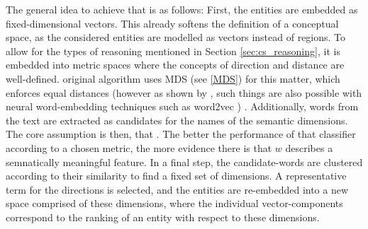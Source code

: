 The general idea to achieve that is as follows: First, the entities %
are embedded as fixed-dimensional vectors. This already softens the definition of a conceptual space, as the considered entities are modelled as vectors instead of regions. %
To allow for the types of reasoning mentioned in Section \ref{sec:cs_reasoning}, %
it is embedded into metric spaces where the concepts of direction and distance are well-defined.  original algorithm uses MDS (see \ref{MDS}) for this matter, which enforces equal distances  %
(however as shown by \textcite{Mikolov:Regularities}, such things are also possible with neural word-embedding techniques such as word2vec \cite{Mikolov:Word2Vec}) %
. Additionally, words from the text are extracted as candidates for the names of the semantic dimensions. The core assumption is then, that  \cite[3574]{Alshaikh2020}. The better the performance of that classifier according to a chosen metric, the more evidence there is that $w$ describes a semnatically meaningful feature. 
In a final step, the candidate-words are clustered according to their similarity to find a fixed set of dimensions. A representative term for the directions is selected, and the entities are re-embedded into a new space comprised of these dimensions, where the individual vector-components correspond to the ranking of an entity with respect to these dimensions.
\newline

